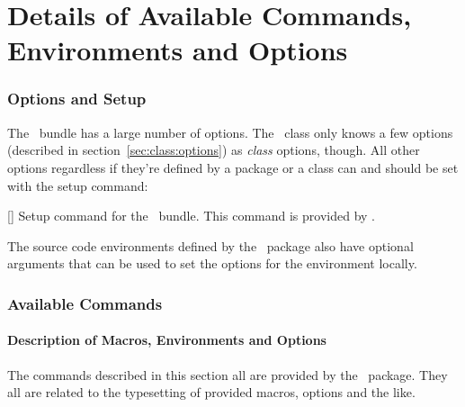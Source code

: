 \documentclass[load-preamble+]{cnltx-doc}
\begin{document}
\part{Details of Available Commands, Environments and Options}

\section{Options and Setup}
The \cnltx\ bundle has a large number of options.  The \cnltxdoc\ class only
knows a few options (described in section~\vref{sec:class:options}) as
\emph{class} options, though.  All other options regardless if they're defined
by a package or a class can and should be set with the setup command:
\begin{commands}
  []
    Setup command for the \cnltx\ bundle.  This command is provided by
    \cnltxbase.
\end{commands}
The source code environments defined by the \cnltxexample\ package also have
optional arguments that can be used to set the options for the environment
locally.

\section{Available Commands}
\subsection{Description of Macros, Environments and  Options}\label{sec:cmds:macros}

The commands described in this section all are provided by the \cnltxexample\
package.  They all are related to the typesetting of
provided macros, options and the like.
\end{document}
